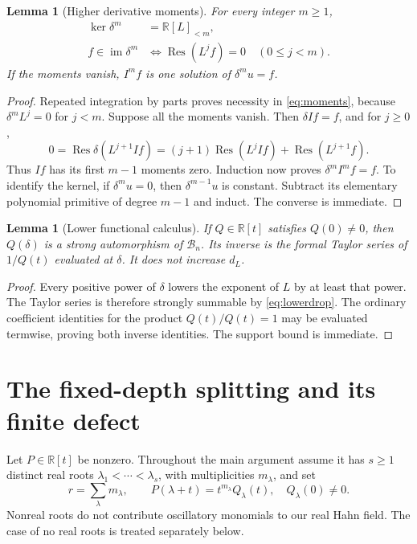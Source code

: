 \documentclass[11pt,a4paper]{article}
\numberwithin{equation}{section}
\newtheorem{lemma}[theorem]{Lemma}
\theoremstyle{definition}
\theoremstyle{remark}
\theoremstyle{definition}
\newcommand{\R}{\mathbb R}
\newcommand{\Bb}{\mathcal B}
\newcommand{\Res}{\operatorname{Res}}
\newcommand{\im}{\operatorname{im}}
\newcommand{\dl}{d_L}
\begin{document}
\begin{lemma}[Higher derivative moments]
\label{lem:moments}
For every integer $m\ge1$,
\begin{align}
 \ker\delta^m&=\R[L]_{<m},\label{eq:kernel-m}\\
 f\in\im\delta^m
 &\Longleftrightarrow
 \Res(L^j f)=0\quad(0\le j<m).
 \label{eq:moments}
\end{align}
If the moments vanish, $I^mf$ is one solution of $\delta^m u=f$.
\end{lemma}
\begin{proof}
Repeated integration by parts proves necessity in \eqref{eq:moments}, because $\delta^m L^j=0$ for $j<m$. Suppose all the moments vanish. Then $\delta If=f$, and for $j\ge0$,
\[
 0=\Res\delta(L^{j+1}If)
 =(j+1)\Res(L^j If)+\Res(L^{j+1}f).
\]
Thus $If$ has its first $m-1$ moments zero. Induction now proves $\delta^m I^mf=f$. To identify the kernel, if $\delta^m u=0$, then $\delta^{m-1}u$ is constant. Subtract its elementary polynomial primitive of degree $m-1$ and induct. The converse is immediate.
\end{proof}

\begin{lemma}[Lower functional calculus]
\label{lem:functional}
If $Q\in\R[t]$ satisfies $Q(0)\ne0$, then $Q(\delta)$ is a strong automorphism of $\Bb_n$. Its inverse is the formal Taylor series of $1/Q(t)$ evaluated at $\delta$. It does not increase $\dl$.
\end{lemma}
\begin{proof}
Every positive power of $\delta$ lowers the exponent of $L$ by at least that power. The Taylor series is therefore strongly summable by \eqref{eq:lowerdrop}. The ordinary coefficient identities for the product $Q(t)/Q(t)=1$ may be evaluated termwise, proving both inverse identities. The support bound is immediate.
\end{proof}

\section{The fixed-depth splitting and its finite defect}
\label{sec:split}
Let $P\in\R[t]$ be nonzero. Throughout the main argument assume it has $s\ge1$ distinct real roots $\lambda_1<\cdots<\lambda_s$, with multiplicities $m_\lambda$, and set
\[
 r=\sum_\lambda m_\lambda,\qquad
 P(\lambda+t)=t^{m_\lambda}Q_\lambda(t),\quad Q_\lambda(0)\ne0.
\]
Nonreal roots do not contribute oscillatory monomials to our real Hahn field. The case of no real roots is treated separately below.
\end{document}
